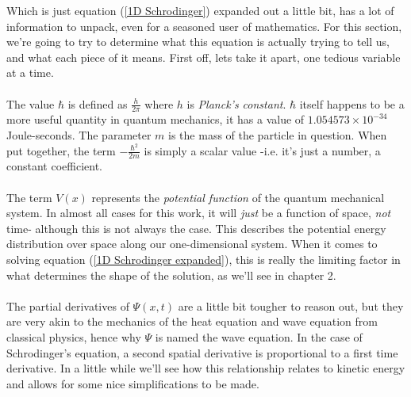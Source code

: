 \documentclass[12pt,letterpaper]{book}
\begin{document}
Which is just equation (\ref{1D Schrodinger}) expanded out a little bit, has a lot of information to unpack, even for a seasoned user of mathematics. For this section, we're going to try to determine what this equation is actually trying to tell us, and what each piece of it means. First off, lets take it apart, one tedious variable at a time. 

\paragraph*{}The value $\hbar$ is defined as $\frac{h}{2\pi}$ where $h$ is \textit{Planck's constant}. $\hbar$ itself happens to be a more useful quantity in quantum mechanics, it has a value of $1.054573\times 10^{-34}$ Joule-seconds. The parameter $m$ is the mass of the particle in question. When put together, the term $-\frac{\hbar^2}{2m}$ is simply a scalar value -i.e. it's just a number, a constant coefficient.

\paragraph*{}The term $V(x)$ represents the \textit{potential function} of the quantum mechanical system. In almost all cases for this work, it will \textit{just} be a function of space, \textit{not} time- although this is not always the case. This describes the potential energy distribution over space along our one-dimensional system. When it comes to solving equation (\ref{1D Schrodinger expanded}), this is really the limiting factor in what determines the shape of the solution, as we'll see in chapter 2.

\paragraph*{}The partial derivatives of $\Psi(x,t)$ are a little bit tougher to reason out, but they are very akin to the mechanics of the heat equation and wave equation from classical physics, hence why $\Psi$ is named the wave equation. In the case of Schrodinger's equation, a second spatial derivative is proportional to a first time derivative. In a little while we'll see how this relationship relates to kinetic energy and allows for some nice simplifications to be made.
\end{document}
